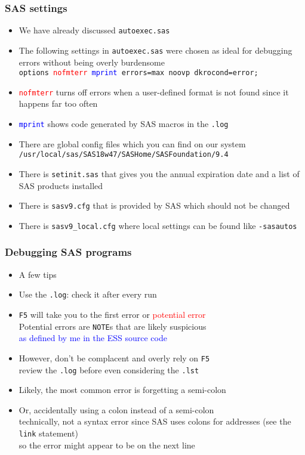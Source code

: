 \documentclass[11pt,pdftex,dvipsnames,usenames,helvetica]{beamer}
\begin{document}
\begin{frame}[fragile]
\frametitle{SAS settings}
\begin{itemize}
\item We have already discussed {\tt autoexec.sas}
\item The following settings in  {\tt autoexec.sas}
were chosen as ideal for debugging errors
without being overly burdensome\\
{\tt options \textcolor{red}{nofmterr} 
\textcolor{blue}{mprint} errors=max noovp dkrocond=error;}
\item {\tt \textcolor{red}{nofmterr}} turns off errors
when a user-defined format is not found
since it happens far too often
\item {\tt \textcolor{blue}{mprint}} shows code generated by SAS macros
in the {\tt .log}
\item There are global config files 
which you can find on our system
{\tt /usr/local/sas/SAS18w47/SASHome/SASFoundation/9.4}
\item There is {\tt setinit.sas} that gives you the
annual expiration date and a list of SAS products installed
\item There is {\tt sasv9.cfg} that is provided by 
SAS which should not be changed
\item There is {\tt sasv9\_local.cfg} where
local settings can be found like {\tt -sasautos}
\end{itemize}

\end{frame}

\begin{frame}[fragile]
\frametitle{Debugging SAS programs}
\begin{itemize}
\item A few tips
\item Use the {\tt .log}: check it after every run
\item {\tt F5} will take you to the first error or 
\textcolor{red}{potential error}\\
Potential errors are {\tt NOTE}s that are likely suspicious\\ 
\textcolor{blue}{as defined by me in the ESS source code}
\item However, don't be complacent and overly rely on {\tt F5}\\
review the {\tt .log} before even considering the {\tt .lst}
\item Likely, the most common error is forgetting a semi-colon
\item Or, accidentally using a colon instead of a semi-colon\\
technically, not a syntax error since SAS uses colons for addresses
(see the {\tt link} statement)\\ 
so the error might appear to be on the next line

\end{itemize}
\end{frame}
\end{document}

